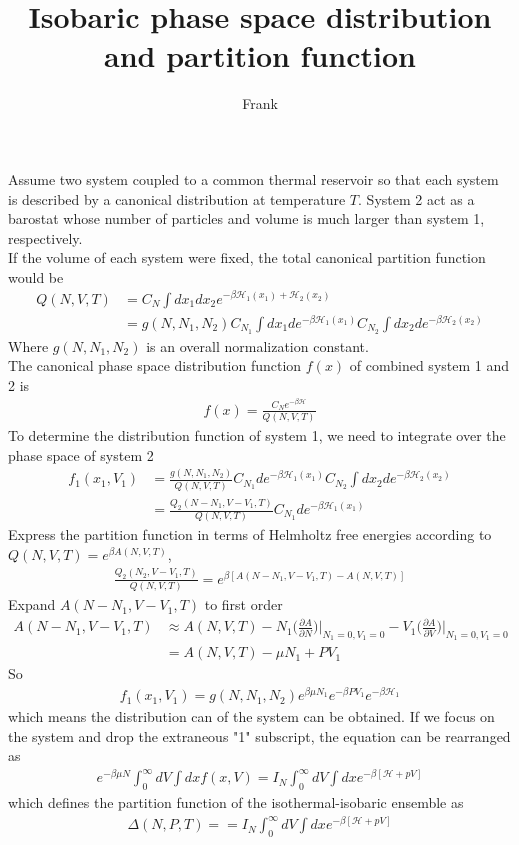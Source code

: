 \documentclass{article}
\title{Isobaric phase space distribution and partition function}
\author{Frank}
\begin{document}
\maketitle
Assume two system coupled to a common thermal reservoir so that each system is described by a canonical distribution at temperature $T$. System 2 act as a barostat whose number of particles and volume is much larger than system 1, respectively.\\
If the volume of each system were fixed, the total canonical partition function would be
\begin{align}
Q(N,V,T)&=C_N\int dx_1dx_2e^{-\beta\mathscr{H}_1(x_1)+\mathscr{H}_2(x_2)}\nonumber\\
&=g(N,N_1,N_2)C_{N_1}\int dx_1de^{-\beta\mathscr{H}_1(x_1)}C_{N_2}\int dx_2de^{-\beta\mathscr{H}_2(x_2)}
\end{align}
Where $g(N,N_1,N_2)$ is an overall  normalization constant.\\
The canonical phase space distribution function $f(x)$  of combined system 1 and 2 is
\begin{align}
f(x)=\frac{C_Ne^{-\beta\mathscr{H}}}{Q(N,V,T)}
\end{align}
To determine the distribution function of system 1, we need to integrate over the phase space of system 2
\begin{align}
f_1(x_1,V_1)&=\frac{g(N,N_1,N_2)}{Q(N,V,T)}C_{N_1}de^{-\beta\mathscr{H}_1(x_1)}C_{N_2}\int dx_2de^{-\beta\mathscr{H}_2(x_2)}\nonumber\\
&=\frac{Q_2(N-N_1,V-V_1,T)}{Q(N,V,T)}C_{N_1}de^{-\beta\mathscr{H}_1(x_1)}
\end{align}
Express the partition function in terms of Helmholtz free energies according to $Q(N,V,T)=e^{\beta A(N,V,T)}$,
\begin{align}
\frac{Q_2(N_2,V-V_1,T)}{Q(N,V,T)}=e^{\beta [A(N-N_1,V-V_1,T)-A(N,V,T)]}
\end{align}
Expand $A(N-N_1,V-V_1,T)$ to first order
\begin{align}
A(N-N_1,V-V_1,T)&\approx A(N,V,T)-N_1\Big(\frac{\partial A}{\partial N}\Big)\Big|_{N_1=0,V_1=0}-V_1\Big(\frac{\partial A}{\partial V}\Big)\Big|_{N_1=0,V_1=0}\nonumber\\
&=A(N,V,T)-\mu N_1+PV_1
\end{align}
So
\begin{align}
f_1(x_1,V_1)=g(N,N_1,N_2)e^{\beta\mu N_1}e^{-\beta PV_1}e^{-\beta\mathscr{H}_1}
\end{align}
which means the distribution can of the system can be obtained.
If we focus on the system and drop the extraneous "1" subscript, the equation can be rearranged as
\begin{align}
e^{-\beta\mu N}\int^{\infty}_0dV\int dxf(x,V)=I_N\int^{\infty}_0dV\int dxe^{-\beta[\mathscr{H}+pV]}
\end{align}
which defines the partition function of the isothermal-isobaric ensemble as
\begin{align}
\Delta(N,P,T)==I_N\int^{\infty}_0dV\int dxe^{-\beta[\mathscr{H}+pV]}
\end{align}
\end{document}
